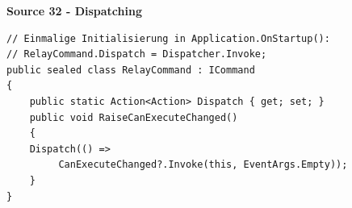 \documentclass[10pt,twoside,landscape]{article}
\begin{document}
\begin{multicols}{2}
\textbf{Source 32 - Dispatching}
\lstset{language=csharp,label= ,caption= ,captionpos=b,numbers=none}
\begin{lstlisting}
// Einmalige Initialisierung in Application.OnStartup():
// RelayCommand.Dispatch = Dispatcher.Invoke;
public sealed class RelayCommand : ICommand
{
    public static Action<Action> Dispatch { get; set; }
    public void RaiseCanExecuteChanged()
    {
	Dispatch(() =>
		 CanExecuteChanged?.Invoke(this, EventArgs.Empty));
    }
}
\end{lstlisting}

\end{multicols}
\end{document}
